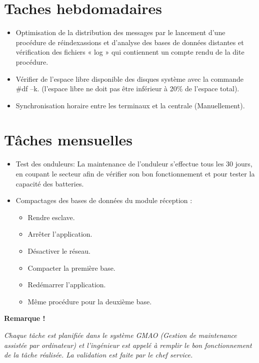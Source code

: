 \section*{Taches hebdomadaires}
\begin{itemize}
\item Optimisation de la distribution des messages par le lancement d’une procédure de réindexassions et d’analyse des bases de données distantes et vérification des fichiers « log » qui contiennent un compte rendu de la dite procédure.\\
\item Vérifier de l’espace libre disponible des disques système avec la commande \#df –k. (l’espace libre ne doit pas être inférieur à 20\% de l’espace total). \\
\item Synchronisation horaire entre les terminaux et la centrale (Manuellement).\\
\end{itemize}
\section*{Tâches mensuelles}
\begin{itemize}
\item Test des onduleurs: La maintenance de l’onduleur s’effectue tous les 30 jours, en coupant le secteur afin de vérifier son bon fonctionnement et pour tester la capacité des batteries. \\
\item Compactages des bases de données du module réception :
\begin{itemize}
\item Rendre esclave.\\
\item Arrêter l’application. \\
\item Désactiver le réseau. \\
\item Compacter la première base.\\
\item Redémarrer l’application.\\
\item Même procédure pour la deuxième base.\\
\end{itemize}
\end{itemize}

\begin{center}
\textbf{Remarque !}

\textit{Chaque tâche est planifiée dans le système GMAO (Gestion de maintenance assistée par ordinateur) et l'ingénieur est appelé à remplir le bon fonctionnement de la tâche réalisée.
 La validation est faite par le chef service.
}
\end{center}

